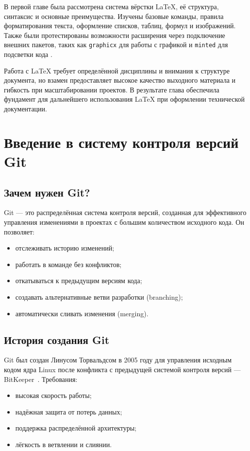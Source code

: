 \documentclass[a4paper,12pt]{report}
\begin{document}

В первой главе была рассмотрена система вёрстки \LaTeX{}, её структура, синтаксис и основные преимущества. Изучены базовые команды, правила форматирования текста, оформление списков, таблиц, формул и изображений. Также были протестированы возможности расширения через подключение внешних пакетов, таких как \texttt{graphicx} для работы с графикой и \texttt{minted} для подсветки кода \cite{latex_minted}.

Работа с \LaTeX{} требует определённой дисциплины и внимания к структуре документа, но взамен предоставляет высокое качество выходного материала и гибкость при масштабировании проектов. В результате глава обеспечила фундамент для дальнейшего использования \LaTeX{} при оформлении технической документации.


\chapter{Введение в систему контроля версий Git}\label{git_introduction}

\section{Зачем нужен Git?}
Git — это распределённая система контроля версий, созданная для эффективного управления изменениями в проектах с большим количеством исходного кода. Он позволяет:
\begin{itemize}[noitemsep]
    \item отслеживать историю изменений;
    \item работать в команде без конфликтов;
    \item откатываться к предыдущим версиям кода;
    \item создавать альтернативные ветви разработки (branching);
    \item автоматически сливать изменения (merging).
\end{itemize}

\section{История создания Git}
Git был создан Линусом Торвальдсом в 2005 году для управления исходным кодом ядра Linux после конфликта с предыдущей системой контроля версий — BitKeeper~\cite{progit_book}. Требования:
\begin{itemize}[noitemsep]
    \item высокая скорость работы;
    \item надёжная защита от потерь данных;
    \item поддержка распределённой архитектуры;
    \item лёгкость в ветвлении и слиянии.
\end{itemize}
\end{document}
